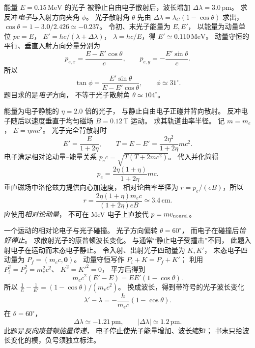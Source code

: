 能量 $E=0.15\,\mathrm{MeV}$ 的光子
被静止自由电子散射后，波长增加
$\Delta\lambda=3.0\,\mathrm{pm}$。
求反冲\emph{电子}与入射方向夹角 $\phi$。
\exsolution
光子散射角 $\theta$ 先由
$\Delta\lambda=\lambda_C(1-\cos\theta)$ 求出，
$\cos\theta=1-3.0/2.426\simeq-0.237$。
令初、末光子能量为 $E,E'$，
以能量为动量单位 $pc=E$，
$E'=hc/(\lambda+\Delta\lambda)$，
$\lambda=hc/E$，得
$E'\simeq0.110\,\mathrm{MeV}$。
动量守恒的平行、垂直入射方向分量分别为
\[
 p_{e,x}=\frac{E-E'\cos\theta}{c},
 \qquad p_{e,y}=-\frac{E'\sin\theta}{c}.
\]
所以
\[
 \boxed{\tan\phi=
 \frac{E'\sin\theta}{E-E'\cos\theta}},
 \qquad
 \boxed{\phi\simeq31^\circ}.
\]
\excheck 题目求的是\emph{电子}方向，
不等于光子散射角 $\theta\simeq104^\circ$。

能量为电子静能的 $\eta=2.0$ 倍的光子，
与静止自由电子正碰并背向散射。
反冲电子随后以速度垂直于均匀磁场
$B=0.12\,\mathrm T$ 运动。
求其轨道曲率半径。
\exsolution
记 $m=m_e$，
$E=\eta mc^2$。
光子完全背散射时
\[
 E'=\frac{E}{1+2\eta},\qquad
 T=E-E'=\frac{2\eta^2}{1+2\eta}mc^2.
\]
电子满足相对论动量--能量关系
$p_ec=\sqrt{T(T+2mc^2)}$。
代入并化简得
\[
 p_e=\frac{2\eta(1+\eta)}{1+2\eta}mc.
\]
垂直磁场中洛伦兹力提供向心加速度，
相对论曲率半径为 $r=p_e/(eB)$，所以
\[
 \boxed{r=\frac{2\eta(1+\eta)m_ec}{(1+2\eta)eB}
 \simeq3.4\,\mathrm{cm}}.
\]
\excheck 应使用\emph{相对论动量}，
不可在 MeV 电子上直接代 $p=mv_{\rm nonrel}$。

一个运动的相对论电子与光子碰撞。
光子方向偏转 $\theta=60^\circ$，
而电子在碰撞后\emph{恰好停止}。
求散射光子的康普顿波长变化。
\exsolution
与通常“静止电子受撞击”不同，
此题入射电子在运动而末态电子静止。
令入射、出射光子四动量为 $K,K'$，
末态电子四动量为 $P_f=(m_ec,\boldsymbol0)$。
动量守恒写作
$P_i+K=P_f+K'$；
利用 $P_i^2=P_f^2=m_e^2c^2$、
$K^2=K'^2=0$，
平方后得到
\[
 m_ec^2(E'-E)=EE'(1-\cos\theta).
\]
所以
$\tfrac1E-\tfrac1{E'}=(1-\cos\theta)/(m_ec^2)$。
换成波长，得到带符号的光子波长变化
\[
 \boxed{\lambda'-\lambda=
 -\frac h{m_ec}(1-\cos\theta)}.
\]
在 $\theta=60^\circ$，
\[
 \boxed{\Delta\lambda\simeq-1.21\,\mathrm{pm}},
 \qquad
 \boxed{|\Delta\lambda|\simeq1.2\,\mathrm{pm}}.
\]
\excheck 此题是\emph{反向康普顿能量传递}，
电子停止使光子能量增加、波长缩短；
书末只给波长变化的模，负号须独立标注。
